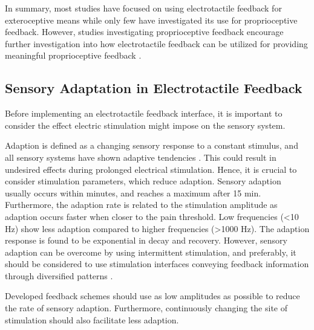 In summary, most studies have focused on using electrotactile feedback for exteroceptive means while only few have investigated its use for proprioceptive feedback. However, studies investigating proprioceptive feedback encourage further investigation into how electrotactile feedback can be utilized for providing meaningful proprioceptive feedback \cite{Strbac2016}.    

\subsection{Sensory Adaptation in Electrotactile Feedback}

Before implementing an electrotactile feedback interface, it is important to consider the effect electric stimulation might impose on the sensory system. 

Adaption is defined as a changing sensory response to a constant stimulus, and all sensory systems have shown adaptive tendencies \cite{Buma2007}. This could result in undesired effects during prolonged electrical stimulation. Hence, it is crucial to consider stimulation parameters, which reduce adaption. Sensory adaption usually occurs within minutes, and reaches a maximum after 15 min. Furthermore, the adaption rate is related to the stimulation amplitude as adaption occurs faster when closer to the pain threshold. Low frequencies (<10 Hz) show less adaption compared to higher frequencies (>1000 Hz). The adaption response is found to be exponential in decay and recovery. \cite{Buma2007,Szeto1982} 
However, sensory adaption can be overcome by using intermittent stimulation, and preferably, it should be considered to use stimulation interfaces conveying feedback information through diversified patterns \cite{Szeto1982,Dosen2016}. 

Developed feedback schemes should use as low amplitudes as possible to reduce the rate of sensory adaption. Furthermore, continuously changing the site of stimulation should also facilitate less adaption. 



